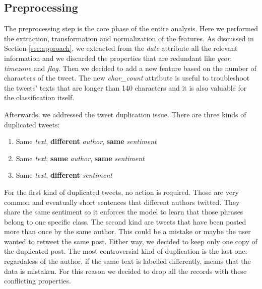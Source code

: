 \documentclass[conference]{IEEEtran}
\begin{document}

\subsection{Preprocessing}\label{sec:preprocessing}
The preprocessing step is the core phase of the entire analysis. Here we performed the extraction, transformation and normalization of the features. As discussed in Section \ref{sec:approach}, we extracted from the \textit{date} attribute all the relevant information and we discarded the properties that are redundant like \textit{year}, \textit{timezone} and \textit{flag}. Then we decided to add a new feature based on the number of characters of the tweet. The new \textit{char\_count} attribute is useful to troubleshoot the tweets' texts that are longer than 140 characters and it is also valuable for the classification itself.

Afterwards, we addressed the tweet duplication issue. There are three kinds of duplicated tweets:
\begin{enumerate}
    \item Same \textit{text}, \textbf{different} \textit{author}, \textbf{same} \textit{sentiment}
    \item Same \textit{text}, \textbf{same} \textit{author}, \textbf{same} \textit{sentiment}
    \item Same \textit{text}, \textbf{different} \textit{sentiment}
\end{enumerate}
For the first kind of duplicated tweets, no action is required. Those are very common and eventually short sentences that different authors twitted. They share the same sentiment so it enforces the model to learn that those phrases belong to one specific class. The second kind are tweets that have been posted more than once by the same author. This could be a mistake or maybe the user wanted to retweet the same post. Either way, we decided to keep only one copy of the duplicated post. The most controversial kind of duplication is the last one: regardaless of the author, if the same text is labelled differently, means that the data is mistaken. %
For this reason we decided to drop all the records with these conflicting properties.
\end{document}
